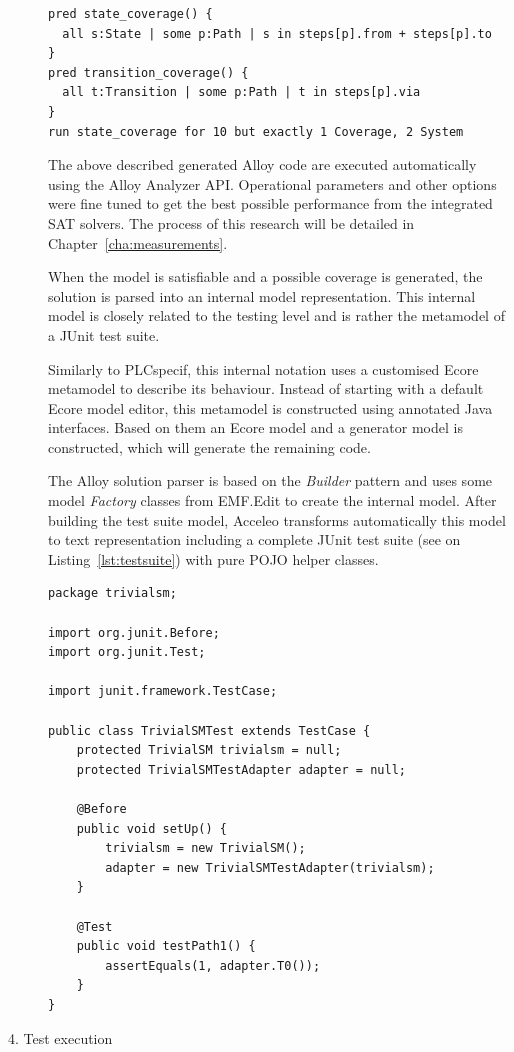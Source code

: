 \begin{description}
\begin{lstlisting}[label={lst:alloycriteria}, caption=Formalising criteria with Alloy,breaklines=true]
pred state_coverage() {
  all s:State | some p:Path | s in steps[p].from + steps[p].to
}
pred transition_coverage() {
  all t:Transition | some p:Path | t in steps[p].via
}
run state_coverage for 10 but exactly 1 Coverage, 2 System
\end{lstlisting}

The above described generated Alloy code are executed automatically using the Alloy Analyzer API. Operational parameters and other options were fine tuned to get the best possible performance from the integrated SAT solvers. The process of this research will be detailed in Chapter~\ref{cha:measurements}.

When the model is satisfiable and a possible coverage is generated, the solution is parsed into an internal model representation. This internal model is closely related to the testing level and is rather the metamodel of a JUnit test suite.

Similarly to PLCspecif, this internal notation uses a customised Ecore metamodel to describe its behaviour. Instead of starting with a default Ecore model editor, this metamodel is constructed using annotated Java interfaces. Based on them an Ecore model and a generator model is constructed, which will generate the remaining code.

The Alloy solution parser is based on the \textit{Builder} pattern and uses some model \textit{Factory} classes from EMF.Edit to create the internal model. After building the test suite model, Acceleo transforms automatically this model to text representation including a complete JUnit test suite (see on Listing~\ref{lst:testsuite}) with pure POJO helper classes.

\begin{lstlisting}[label={lst:testsuite}, caption=Generated JUnit test suite,breaklines=true]
package trivialsm;

import org.junit.Before;
import org.junit.Test;

import junit.framework.TestCase;

public class TrivialSMTest extends TestCase {
	protected TrivialSM trivialsm = null;
	protected TrivialSMTestAdapter adapter = null;
	   
	@Before 
	public void setUp() {
		trivialsm = new TrivialSM();
		adapter = new TrivialSMTestAdapter(trivialsm);
	}
	
	@Test
	public void testPath1() {
		assertEquals(1, adapter.T0());
	}
}
\end{lstlisting}


	\item[4. Test execution]
\end{description}
